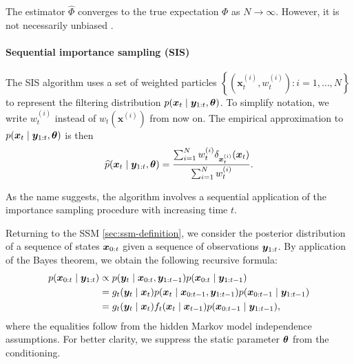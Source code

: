 The estimator $\widehat{\Phi}$ converges to the true expectation $\Phi$ as $N \to \infty$. However, it is not necessarily unbiased \citep{information-theory}.


\paragraph{Sequential importance sampling (SIS)}
The SIS algorithm uses a set of weighted particles $\left\{\left(\bm{x}_t^{(i)}, w_t^{(i)} \right) : i = 1, \ldots, N \right\}$ to represent the filtering distribution $p(\bm{x}_t \mid \bm{y}_{1:t}, \bm{\theta})$. To simplify notation, we write $w_t^{(i)}$ instead of $w_t(\bm{x}^{(i)})$ from now on. The empirical approximation to ${p(\bm{x}_t \mid \bm{y}_{1:t}, \bm{\theta})}$ is then
\begin{equation*}
\widehat{p}(\bm{x}_t \mid \bm{y}_{1:t}, \bm{\theta}) = \frac{\sum_{i=1}^N w_t^{(i)} \delta_{\bm{x}_t^{(i)}}(\bm{x}_t)}{\sum_{i=1}^N w_t^{(i)}}.
\end{equation*}

As the name suggests, the algorithm involves a sequential application of the importance sampling procedure with increasing time $t$.

Returning to the SSM \eqref{sec:ssm-definition}, we consider the posterior distribution of a sequence of states $\bm{x}_{0:t}$ given a sequence of observations $\bm{y}_{1:t}$. By application of the Bayes theorem, we obtain the following recursive formula:
\begin{equation*}
\begin{split}
p(\bm{x}_{0:t} \mid \bm{y}_{1:t}) & \propto p(\bm{y}_t \mid \bm{x}_{0:t}, \bm{y}_{1:t-1}) p(\bm{x}_{0:t} \mid \bm{y}_{1:t-1}) \\
&= g_t(\bm{y}_t \mid \bm{x}_t) p(\bm{x}_t \mid \bm{x}_{0:t-1}, \bm{y}_{1:t-1}) p(\bm{x}_{0:t-1} \mid \bm{y}_{1:t-1}) \\
&= g_t(\bm{y}_t \mid \bm{x}_t) f_t(\bm{x}_t \mid \bm{x}_{t-1}) p(\bm{x}_{0:t-1} \mid \bm{y}_{1:t-1}),
\end{split}
\end{equation*}
where the equalities follow from the hidden Markov model independence assumptions. For better clarity, we suppress the static parameter $\bm{\theta}$ from the conditioning.

